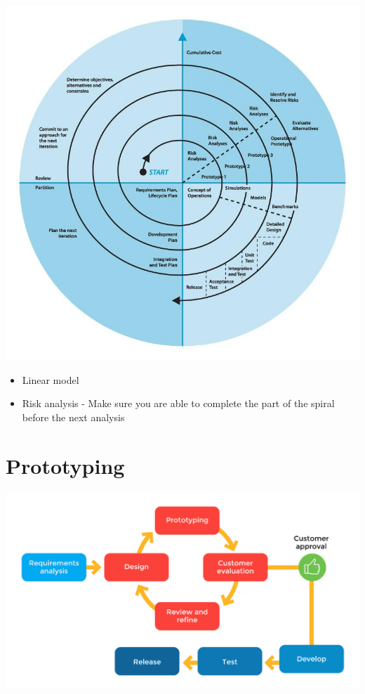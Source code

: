 \documentclass{article}[18pt]
\begin{document}
\begin{center}
	\includegraphics[scale=0.7]{Spiral}
\end{center}
\begin{itemize}
	\item Linear model
	\item Risk analysis - Make sure you are able to complete the part of the spiral before the next analysis 
\end{itemize}
\section{Prototyping}
\begin{center}
	\includegraphics[scale=0.7]{Prototyping}
\end{center}
\end{document}
